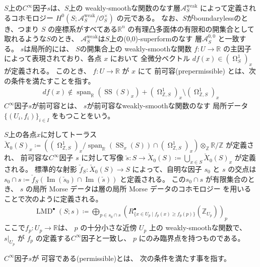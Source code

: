\documentclass[uplatex,dvipdfmx,12pt]{jsarticle}
\numberwithin{equation}{section}
\theoremstyle{definition}
\newcommand{\deq}{\coloneqq}
\newcommand{\opn}[1]{\operatorname{#1}}
\DeclareMathOperator{\tform}{\Omega}
\begin{document}
$S$上の$C^{\infty}$因子$s$は、$S$上の
weakly-smoothな関数のなす層$\mathcal{A}^{\mathrm{weak}}_S$
によって定義されるコホモロジー
$H^{0}(S;\mathcal{A}^{\mathrm{weak}}_S/\mathcal{O}^{\times}_S)$
の元である。
なお、$S$がboundarylessのとき、つまり
$S$ の座標系がすべてある$\mathbb{R}^{n}$ 
の有理凸多面体の有限和の開集合として取れるような$S$のとき、
$\mathcal{A}^{\mathrm{weak}}_S$は$S$上の(0,0)-superformのなす
層$\mathcal{A}^{0,0}_S$ \cite{MR3903579}と一致する。
$s$は局所的には、
$S$の開集合上の 
weakly-smoothな関数 $f\colon U\to \mathbb{R}$
の主因子によって表現されており、各点 $x$ において
全微分ベクトル $df(x)\in(\tform_{S}^{1})_x$ 
が定義される。
このとき、
$f\colon U \to \mathbb{R}$ が $x$ にて
前可容(prepermissible)
とは、次の条件を満たすことを指す。
\begin{align}
df(x)\notin\opn{span}_{\mathbb{R}}(\opn{SS}(S)_x)+
(\tform_{\mathbb{Z},S}^{1})_x 
\setminus (\tform_{\mathbb{Z},S}^{1})_x
\end{align}
$C^{\infty}$因子$s$が前可容とは、
$s$が前可容なweakly-smoothな関数のなす
局所データ$\{(U_i,f_i)\}_{i\in I}$
をもつことをいう。

$S$上の各点$x$に対してトーラス
$\check{X}_0(S)_x\deq ((\tform^{1}_{\mathbb{Z},S})_x/
\opn{span}_{\mathbb{R}}(\opn{SS}_x(S))\cap 
(\tform^{1}_{\mathbb{Z},S})_x)\otimes_{\mathbb{Z}}
\mathbb{R}/\mathbb{Z}$ が定義され、
前可容な$C^{\infty}$因子 $s$ に対して写像
$\check{s}\colon S\to \check{X}_0(S)\deq 
\bigcup_{x\in S} \check{X}_0(S)_x$ が定義される。 
標準的な射影 $\check{f}_{S}\colon \check{X}_0(S)\to S$
によって、自明な因子 $s_0$ と $s$ の交点は
$s_0\cap s\deq \check{f}_{S}(\opn{Im}(\check{s}_0)\cap 
\opn{Im}(\check{s}))$ と定義される。
この$s_0\cap s$ が有限集合のとき、
$s$ の局所 Morse データは層の局所 Morse データのコホモロジー
を用いることで次のように定義される。
\begin{align} \label{equation-local-morse-data}
\opn{LMD}^{\bullet}(S;s)\deq 
\bigoplus_{p\in s_0\cap s} 
(R^{\bullet}_{\{x\in U_p\mid f_p(x)\geq f_p(p)\}}(\mathbb{Z}_{U_p}))_p
\end{align}
ここで$f_p\colon U_p\to \mathbb{R}$は、
$p$ の十分小さな近傍 $U_p$ 上の weakly-smoothな関数で、
$s|_{U_p}$ が $f_p$ の定義する$C^{\infty}$因子と一致し、
$p$ にのみ臨界点を持つものである。

$C^{\infty}$因子$s$が
可容である(permissible)とは、
次の条件を満たす事を指す。
\end{document}
